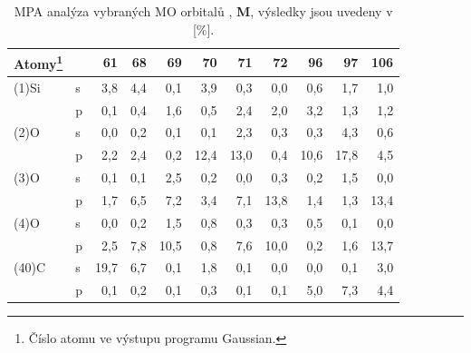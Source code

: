 \documentclass[
digital, %
table,   %
lof,     %
lot,     %
oneside,
]{fithesis3}
\begin{document}
\begin{table}[htbp]\begin{minipage}{\textwidth}
\caption{MPA analýza vybraných MO orbitalů , \textbf{M}, výsledky jsou uvedeny v [\%].}
\begin{center}
\begin{tabular}{|l|l|r|r|r|r|r|r|r|r|r|}
\hline
Atomy\footnote{Číslo atomu ve výstupu programu Gaussian.}   \label{si_model_methyl_MPA_I}  &  & 61 & 68 &69 & 70 & 71 & 72 & 96 & 97 & 106 \\ \hline
(1)Si  & s & 3,8  & 4,4 &  0,1  & 3,9  & 0,3  & 0,0  & 0,6  & 1,7  & 1,0  \\ \hline
& p & 0,1  & 0,4& 1,6  & 0,5  & 2,4  & 2,0  & 3,2  & 1,3  & 1,2  \\ \hline
(2)O & s & 0,0  & 0,2& 0,1  & 0,1  & 2,3  & 0,3  & 0,3  & 4,3  & 0,6  \\ \hline
& p & 2,2  & 2,4& 0,2  & 12,4  & 13,0  & 0,4  & 10,6  & 17,8  & 4,5  \\ \hline
(3)O & s & 0,1  & 0,1& 2,5  & 0,2  & 0,0  & 0,3  & 0,2  & 1,5  & 0,0  \\ \hline
& p & 1,7  & 6,5 &7,2  & 3,4  & 7,1  & 13,8  & 1,4  & 1,3  & 13,4  \\ \hline
(4)O & s & 0,0  & 0,2& 1,5  & 0,8  & 0,3  & 0,3  & 0,5  & 0,1  & 0,0  \\ \hline
& p & 2,5  & 7,8& 10,5  & 0,8  & 7,6  & 10,0  & 0,2  & 1,6  & 13,7  \\ \hline
(40)C & s & 19,7  & 6,7& 0,1  & 1,8  & 0,1  & 0,0  & 0,0  & 0,1  & 3,0  \\ \hline
& p & 0,1  & 0,2& 0,1  & 0,3  & 0,1  & 0,1  & 5,0  & 7,3  & 4,4  \\ \hline
\end{tabular}
\end{center}\end{minipage}\end{table}
\end{document}
